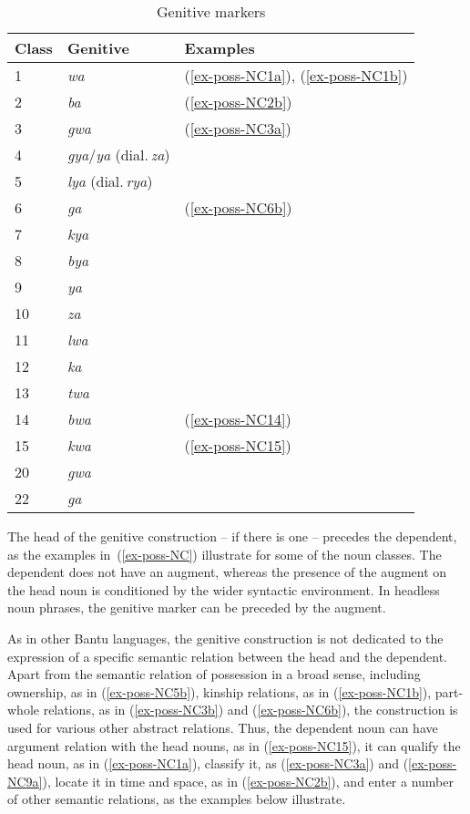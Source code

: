 \begin{table}
\caption{Genitive markers}
 
\begin{tabular}{l l l}
\hline
 
Class	& Genitive & Examples\\
\hline
1 & \emph{wa} & (\ref{ex-poss-NC1a}), (\ref{ex-poss-NC1b})\\
2 & \emph{ba} & (\ref{ex-poss-NC2b})\\
3 & \emph{gwa} & (\ref{ex-poss-NC3a})\\
4 & \emph{gya}/\emph{ya} (dial.\,\emph{za}) &\\
5 & \emph{lya} (dial.\,\emph{rya})& \\
6 & \emph{ga} & (\ref{ex-poss-NC6b})\\
7 & \emph{kya} &\\
8 & \emph{bya} &\\
9 & \emph{ya} &\\
10 & \emph{za} &\\
11 & \emph{lwa} &\\
12 & \emph{ka} &\\
13 & \emph{twa}  &\\
14 & \emph{bwa} & (\ref{ex-poss-NC14})\\
15 & \emph{kwa} & (\ref{ex-poss-NC15})\\
20 & \emph{gwa} &\\
22 & \emph{ga} &\\
\hline
\end{tabular}
\label{tab-genitive}
\end{table}

\largerpage
The head of the genitive construction – if there is one – precedes the dependent, as the examples in~(\ref{ex-poss-NC}) illustrate for some of the noun classes. 
The dependent does not have an augment, whereas the presence of the augment on the head noun is conditioned by the wider syntactic environment. 
In headless noun phrases, the genitive marker can be preceded by the augment.

As in other Bantu languages, the genitive construction is not dedicated to the expression of a specific semantic relation between the head and the dependent. 
Apart from the semantic relation of possession in a broad sense, including ownership, as in (\ref{ex-poss-NC5b}), kinship relations, as in (\ref{ex-poss-NC1b}), part-whole relations, as in (\ref{ex-poss-NC3b}) and  (\ref{ex-poss-NC6b}), the construction is used for various other abstract relations. 
Thus, the dependent noun can have argument relation with the head nouns, as in (\ref{ex-poss-NC15}), it can qualify the head noun, as in (\ref{ex-poss-NC1a}), classify it, as (\ref{ex-poss-NC3a}) and (\ref{ex-poss-NC9a}), locate it in time and space, as in (\ref{ex-poss-NC2b}), and enter a number of other semantic relations, as the examples below illustrate.

